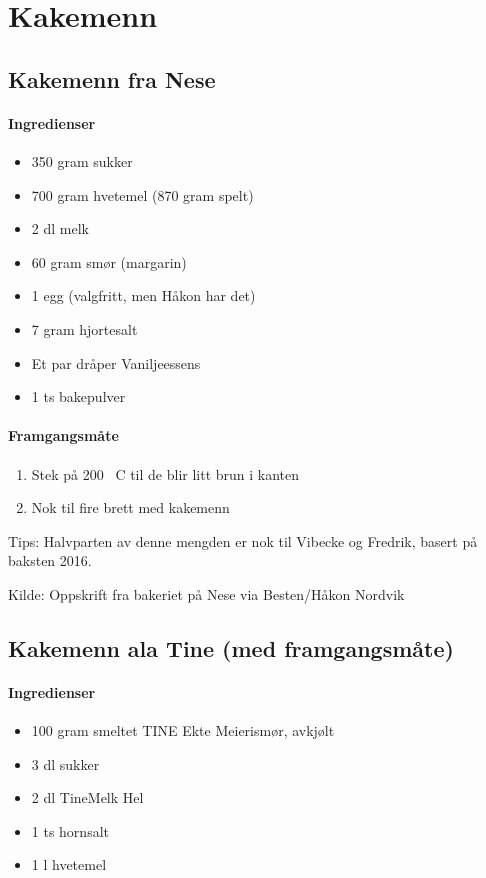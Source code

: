 \section{Kakemenn}

\subsection{Kakemenn fra Nese}

\paragraph{Ingredienser}
\begin{itemize}[noitemsep]
	\item 350 gram sukker
	\item 700 gram hvetemel (870 gram spelt)
	\item 2 dl melk
	\item 60 gram smør (margarin)
	\item 1 egg (valgfritt, men Håkon har det)
	\item 7 gram hjortesalt
	\item Et par dråper Vaniljeessens
	\item 1 ts bakepulver
\end{itemize}

\paragraph{Framgangsmåte}
\begin{enumerate}[noitemsep]
	\item Stek på 200 \degree~C til de blir litt brun i kanten
	\item Nok til fire brett med kakemenn
\end{enumerate}

Tips: Halvparten av denne mengden er nok til Vibecke og Fredrik, basert på baksten 2016.

Kilde: Oppskrift fra bakeriet på Nese via Besten/Håkon Nordvik


\subsection{Kakemenn ala Tine (med framgangsmåte)}

\paragraph{Ingredienser}
\begin{itemize}[noitemsep]
	\item 100 gram smeltet TINE Ekte Meierismør, avkjølt
	\item 3 dl sukker
	\item 2 dl TineMelk Hel
	\item 1 ts hornsalt
	\item 1 l hvetemel
\end{itemize}

